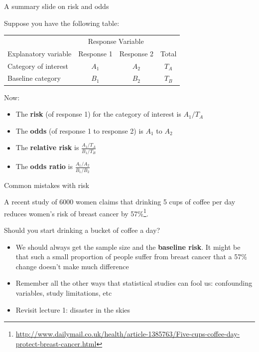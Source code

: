 \documentclass[12pt,xcolor=dvipsnames,handout,mathserif,aspectratio=169]{beamer}
\newcommand{\bbl}[1]{{\color{NavyBlue} \textbf{#1}}}
\newcommand{\bgr}[1]{{\color{PineGreen} \textbf{#1}}}
\begin{document}
\begin{frame}{A summary slide on risk and odds}

\begin{block}{}
Suppose you have the following table:
\begin{center}
\begin{tabular}{lccc}
\hline
 & \multicolumn{2}{c}{Response Variable} & \\
Explanatory variable & Response 1 & Response 2 & Total \\
\hline
Category of interest & $A_1$ & $A_2$ & $T_A$ \\
Baseline category & $B_1$ & $B_2$ & $T_B$ \\
\hline
\end{tabular}
\end{center}
Now:
\begin{itemize}
\item The \bgr{risk} (of response 1) for the category of interest is $A_1/T_A$
\item The \bgr{odds} (of response 1 to response 2) is $A_1$ to $A_2$
\item The \bbl{relative risk} is $\frac{A_1/T_A}{B_1/T_B}$
\item The \bbl{odds ratio} is $\frac{A_1/A_2}{B_1/B_2}$
\end{itemize}

\end{block}
\end{frame}

\begin{frame}{Common mistakes with risk}

\begin{block}{}
A recent study of 6000 women claims that drinking 5 cups of coffee per day reduces women's risk of breast cancer by 57\%\footnote{\url{http://www.dailymail.co.uk/health/article-1385763/Five-cups-coffee-day-protect-breast-cancer.html}}.
\end{block}
Should you start drinking a bucket of coffee a day?\\
\pause
\vspace{0.2cm}
\begin{itemize}
\item We should always get the sample size and the \bgr{baseline risk}. It might be that such a small proportion of people suffer from breast cancer that a 57\% change doesn't make much difference
\item Remember all the other ways that statistical studies can fool us: confounding variables, study limitations, etc
\item Revisit lecture 1: disaster in the skies
\end{itemize}
\end{frame}
\end{document}
